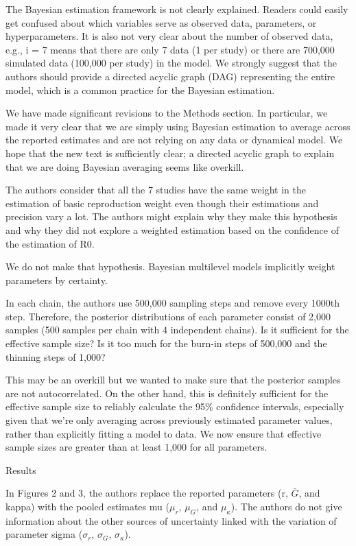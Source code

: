 \documentclass[12pt]{article}
\newcommand{\revtext}{\textsf}
\begin{document}
\revtext{The Bayesian estimation framework is not clearly explained. Readers could easily get confused
about which variables serve as observed data, parameters, or hyperparameters. It is also not
very clear about the number of observed data, e.g., i = 7 means that there are only 7 data (1 per
study) or there are 700,000 simulated data (100,000 per study) in the model. We strongly
suggest that the authors should provide a directed acyclic graph (DAG) representing the entire
model, which is a common practice for the Bayesian estimation.}

We have made significant revisions to the Methods section. 
In particular, we made it very clear that we are simply using Bayesian estimation to average across the reported estimates and are not relying on any data or dynamical model.
We hope that the new text is sufficiently clear; a directed acyclic graph to explain that we are doing Bayesian averaging seems like overkill.

\revtext{The authors consider that all the 7 studies have the same weight in the estimation of basic
reproduction weight even though their estimations and precision vary a lot. The authors might
explain why they make this hypothesis and why they did not explore a weighted estimation
based on the confidence of the estimation of R0.}

We do not make that hypothesis. Bayesian multilevel models implicitly weight parameters by certainty.

\revtext{In each chain, the authors use 500,000 sampling steps and remove every 1000th step.
Therefore, the posterior distributions of each parameter consist of 2,000 samples (500 samples
per chain with 4 independent chains). Is it sufficient for the effective sample size? Is it too much
for the burn-in steps of 500,000 and the thinning steps of 1,000?}

This may be an overkill but we wanted to make sure that the posterior samples are not autocorrelated.
On the other hand, this is definitely sufficient for the effective sample size to reliably calculate the 95\% confidence intervals, especially given that we're only averaging across previously estimated parameter values, rather than explicitly fitting a model to data. We now ensure that effective sample sizes are greater than at least 1,000 for all parameters.

\revtext{Results}

\revtext{In Figures 2 and 3, the authors replace the reported parameters (r, $\bar G$, and kappa) with the
pooled estimates mu ($\mu_r$, $\mu_G$, and $\mu_\kappa$). The authors do not give information about
the other sources of uncertainty linked with the variation of parameter sigma ($\sigma_r$, $\sigma_G$,
$\sigma_\kappa$).}
\end{document}
